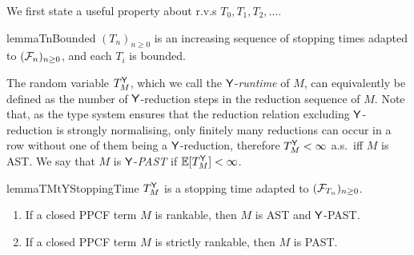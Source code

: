 We first state a useful property about r.v.s $T_0, T_1, T_2, \dots$.
\begin{restatable}{lemma}{TnBounded}
\label{lem:TnBounded}
$(T_n)_{n \geq 0}$ is an increasing sequence of stopping times adapted to $(\mathcal{F}_n)_{n \geq 0}$, and each $T_i$ is bounded.
\end{restatable}


The random variable $T_M^{\mathsf{Y}}$, which we call the $\mathsf{Y}$-\emph{runtime} of $M$, can equivalently be defined as the number of $\mathsf{Y}$-reduction steps in the reduction sequence of $M$. 
Note that, as the type system ensures that the reduction relation excluding $\mathsf{Y}$-reduction is strongly normalising, only finitely many reductions can occur in a row without one of them being a $\mathsf{Y}$-reduction, therefore $T_M^{\mathsf{Y}} < \infty$ a.s.~iff $M$ is AST. 
We say that $M$ is $\mathsf{Y}$-\emph{PAST} if $\mathbb{E}[T^{\mathsf{Y}}_M] < \infty$.

\begin{restatable}{lemma}{TMtYStoppingTime}
\label{lem:TMtY is a stopping time}
$T_M^{\mathsf{Y}}$ is a stopping time adapted to $(\mathcal{F}_{T_n})_{n \geq 0}$.
\end{restatable}

\begin{theorem} \label{thm:rankable implies termination}
\begin{enumerate}
\item If a closed PPCF term $M$ is rankable, then $M$ is AST and $\mathsf{Y}$-PAST.

\item If a closed PPCF term $M$ is strictly rankable, then $M$ is PAST.
\end{enumerate}
\end{theorem}

